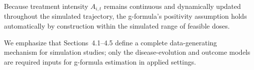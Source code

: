 Because treatment intensity $A_{i,t}$ remains continuous and dynamically updated throughout the simulated trajectory, the g-formula’s positivity assumption holds automatically by construction within the simulated range of feasible doses.

We emphasize that Sections~4.1--4.5 define a complete data-generating mechanism for simulation studies; only the disease-evolution and outcome models are required inputs for g-formula estimation in applied settings.

